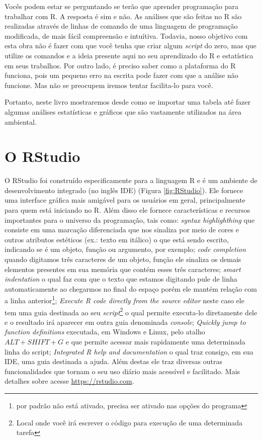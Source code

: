 \documentclass[titlepage, oneside, openany, a4paper]{book}
\begin{document}
Vocês podem estar se perguntando se terão que aprender programação para trabalhar com R. A resposta é sim e não. As análises que são feitas no R são realizadas através de linhas de comando de uma linguagem de programação modificada, de mais fácil compreensão e intuítiva. Todavia, nosso objetivo com esta obra não é fazer com que você tenha que criar algum \emph{script} do zero, mas que utilize os comandos e a ideia presente aqui no seu aprendizado do R e estatística em seus trabalhos. Por outro lado, é preciso saber como a plataforma do R funciona, pois um pequeno erro na escrita pode fazer com que a análise não funcione. Mas não se preocupem iremos tentar facilita-lo para você.

Portanto, neste livro mostraremos desde como se importar uma tabela até fazer algumas análises estatísticas e gráficos que são vastamente utilizados na área ambiental.

\hypertarget{o-rstudio}{%
\section{O RStudio}\label{o-rstudio}}

O RStudio foi construído especificamente para a linguagem R e é um ambiente de desenvolvimento integrado (no inglês IDE) (Figura \ref{fig:RStudio}). Ele fornece uma interface gráfica mais amigável para os usuários em geral, principalmente para quem está iniciando no R. Além disso ele fornece características e recursos importantes para o universo da programação, tais como: \emph{syntax highlighthing} que consiste em uma marcação diferenciada que nos sinaliza por meio de cores e outros atributos estéticos (ex.: texto em itálico) o que está sendo escrito, indicando se é um objeto, função ou argumento, por exemplo; \emph{code completion} quando digitamos três caracteres de um objeto, função ele sinaliza os demais elementos presentes em sua memória que contém esses três caracteres; \emph{smart indentation} o qual faz com que o texto que estamos digitando pule de linha automaticamente ao chegarmos no final do espaço porém ele mantém relação com a linha anterior\footnote{por padrão não está ativado, precisa ser ativado nas opções do programa}; \emph{Execute R code directly from the source editor} neste caso ele tem uma guia destinada ao seu \emph{script}\footnote{Local onde você irá escrever o código para execução de uma determinada tarefa} o qual permite executa-lo diretamente dele e o resultado irá aparecer em outra guia denominada \emph{console}; \emph{Quickly jump to function definitions} executada, em Windows e Linux, pelo atalho \(ALT + SHIFT + G\) e que permite acessar mais rapidamente uma determinada linha do script; \emph{Integrated R help and documentation} o qual traz consigo, em sua IDE, uma guia destinada a ajuda. Além destas ele traz diversas outras funcionalidades que tornam o seu uso diário mais acessível e facilitado. Mais detalhes sobre acesse \url{https://rstudio.com}.
\end{document}
